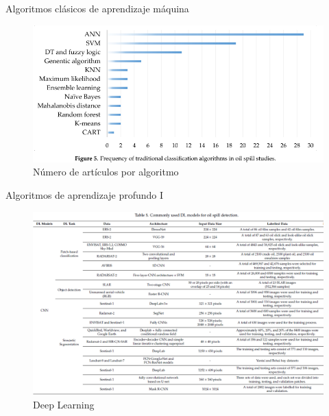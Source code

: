 \begin{frame}{Algoritmos clásicos de aprendizaje máquina}
    \begin{figure}
        \centering
        \includegraphics[scale=1.2]{img/section_02/frecuencias_machine_learning.png}
        \caption{Número de artículos por algoritmo}
        \label{fig:my_label}
    \end{figure}
\end{frame}


\begin{frame}{Algoritmos de aprendizaje profundo I}
    \begin{figure}
        \centering
        \includegraphics[scale=0.4]{img/section_02/oil_spill_detection_deep_learning.png}
        \caption{Deep Learning \cite{rs12203338}}
        \label{fig:my_label}
    \end{figure}
\end{frame}

